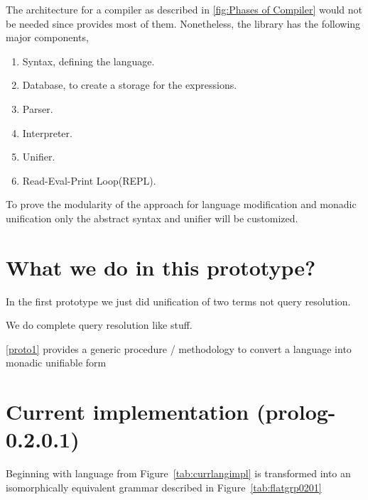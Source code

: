 \documentclass[thesis-solanki.tex]{subfiles}
\begin{document}
The architecture for a compiler as described in \ref{fig:Phases of Compiler} would not be needed since  provides most of
them. Nonetheless, the library has the following major components,

\begin{enumerate}
\item Syntax, defining the language.

\item Database, to create a storage for the expressions.

\item Parser.

\item Interpreter.

\item Unifier.

\item Read-Eval-Print Loop(REPL). 
\end{enumerate}

To prove the modularity of the approach for language modification and monadic unification only the abstract syntax and unifier will be
customized.


\clearpage
\section{What we do in this prototype?}
In the first prototype we just did unification of two terms not query resolution.

We do complete  query resolution like stuff.

\ref{proto1} provides a generic procedure / methodology to convert a language into monadic unifiable form

\clearpage
\section{Current implementation (prolog-0.2.0.1)}

Beginning with language from Figure~\ref{tab:currlangimpl} is transformed into an isomorphically equivalent grammar described in 
Figure~\ref{tab:flatgrp0201}
\end{document}
